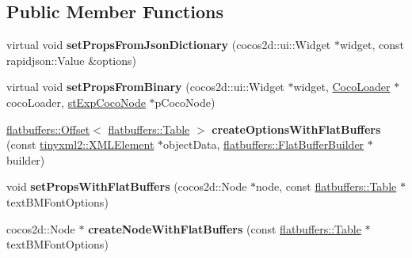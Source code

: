 \subsection*{Public Member Functions}
\begin{DoxyCompactItemize}
\item 
\mbox{\label{classcocostudio_1_1TextBMFontReader_a8f68f02bc9422fb026c0f613397c4675}} 
virtual void {\bfseries set\+Props\+From\+Json\+Dictionary} (cocos2d\+::ui\+::\+Widget $\ast$widget, const rapidjson\+::\+Value \&options)
\item 
\mbox{\label{classcocostudio_1_1TextBMFontReader_a89d0d47c3a3a2956dbdbb58a2f621491}} 
virtual void {\bfseries set\+Props\+From\+Binary} (cocos2d\+::ui\+::\+Widget $\ast$widget, \hyperlink{classcocostudio_1_1CocoLoader}{Coco\+Loader} $\ast$coco\+Loader, \hyperlink{structcocostudio_1_1stExpCocoNode}{st\+Exp\+Coco\+Node} $\ast$p\+Coco\+Node)
\item 
\mbox{\label{classcocostudio_1_1TextBMFontReader_a5cc48ba3a8d7b3f8ff336285f8f76bde}} 
\hyperlink{structflatbuffers_1_1Offset}{flatbuffers\+::\+Offset}$<$ \hyperlink{classflatbuffers_1_1Table}{flatbuffers\+::\+Table} $>$ {\bfseries create\+Options\+With\+Flat\+Buffers} (const \hyperlink{classtinyxml2_1_1XMLElement}{tinyxml2\+::\+X\+M\+L\+Element} $\ast$object\+Data, \hyperlink{classflatbuffers_1_1FlatBufferBuilder}{flatbuffers\+::\+Flat\+Buffer\+Builder} $\ast$builder)
\item 
\mbox{\label{classcocostudio_1_1TextBMFontReader_a85c86f5ac8d3aa9dba1d66faced29933}} 
void {\bfseries set\+Props\+With\+Flat\+Buffers} (cocos2d\+::\+Node $\ast$node, const \hyperlink{classflatbuffers_1_1Table}{flatbuffers\+::\+Table} $\ast$text\+B\+M\+Font\+Options)
\item 
\mbox{\label{classcocostudio_1_1TextBMFontReader_a057ce736a2f4fcb6ce8cc20a55090aab}} 
cocos2d\+::\+Node $\ast$ {\bfseries create\+Node\+With\+Flat\+Buffers} (const \hyperlink{classflatbuffers_1_1Table}{flatbuffers\+::\+Table} $\ast$text\+B\+M\+Font\+Options)
\item 
\mbox{\label{classcocostudio_1_1TextBMFontReader_a8f68f02bc9422fb026c0f613397c4675}} 

\end{DoxyCompactItemize}
